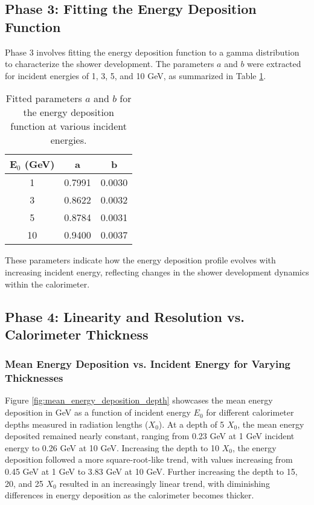 \documentclass[twocolumn]{aastex631}
\begin{document}
\subsection{Phase 3: Fitting the Energy Deposition Function}

Phase 3 involves fitting the energy deposition function to a gamma distribution to characterize the shower development. The parameters \(a\) and \(b\) were extracted for incident energies of 1, 3, 5, and 10 GeV, as summarized in Table \ref{tab:fitted_parameters}.

\begin{table}[htp]
    \centering
    \caption{Fitted parameters \(a\) and \(b\) for the energy deposition function at various incident energies.}
    \label{tab:fitted_parameters}
    \begin{tabular}{ccc}
        \hline
        \textbf{E\(_0\) (GeV)} & \textbf{a} & \textbf{b} \\
        \hline
        1 & 0.7991 & 0.0030 \\
        3 & 0.8622 & 0.0032 \\
        5 & 0.8784 & 0.0031 \\
        10 & 0.9400 & 0.0037 \\
        \hline
    \end{tabular}
\end{table}

These parameters indicate how the energy deposition profile evolves with increasing incident energy, reflecting changes in the shower development dynamics within the calorimeter.

\subsection{Phase 4: Linearity and Resolution vs. Calorimeter Thickness}

\subsubsection{Mean Energy Deposition vs. Incident Energy for Varying Thicknesses}

Figure \ref{fig:mean_energy_deposition_depth} showcases the mean energy deposition in GeV as a function of incident energy \(E_0\) for different calorimeter depths measured in radiation lengths (\(X_0\)). At a depth of 5 \(X_0\), the mean energy deposited remained nearly constant, ranging from 0.23 GeV at 1 GeV incident energy to 0.26 GeV at 10 GeV. Increasing the depth to 10 \(X_0\), the energy deposition followed a more square-root-like trend, with values increasing from 0.45 GeV at 1 GeV to 3.83 GeV at 10 GeV. Further increasing the depth to 15, 20, and 25 \(X_0\) resulted in an increasingly linear trend, with diminishing differences in energy deposition as the calorimeter becomes thicker.
\end{document}
